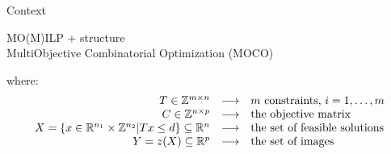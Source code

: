 \documentclass[10pt,xcolor=dvipsnames]{beamer}
\newcommand{\mR}{\mathbb{R}}
\newcommand{\mZ}{\mathbb{Z}}
\newcommand{\red}{\textcolor{red}}
\newcommand{\blue}{\textcolor{blue}}
\begin{document}
\begin{frame}{Context}
\begin{center}
MO(M)ILP + structure\\
MultiObjective Combinatorial Optimization (MOCO)
\end{center}
\vspace{2mm}
\noindent 
where:
\vspace{-6mm}
$$
\begin{array}{rcl}
T \in \mZ^{m \times n} & \longrightarrow & m \hbox{ constraints, } i = 1,\ldots,m\\
%
C \in \mZ^{n\times p} & \longrightarrow & \hbox{the objective matrix}\\
%
X=\{x \in \mR^{n_1} \times \mZ^{n_2}| Tx\leq d\}\subseteq\mR^n  & \longrightarrow & \hbox{the set of feasible solutions}\\
Y=z(X)\subseteq \mR^p & \longrightarrow & \hbox{the set of images}\\
\notag
\end{array}
$$


\end{frame}
\end{document}
